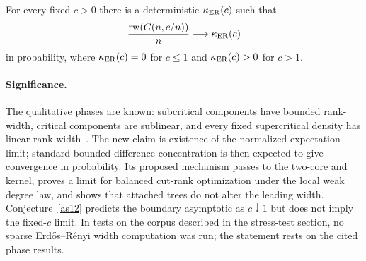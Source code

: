 \begin{conjecture}\label{as15}
For every fixed $c>0$ there is a deterministic $\kappa_{\rm ER}(c)$ such that
\[
 \frac{\operatorname{rw}(G(n,c/n))}{n}\longrightarrow
 \kappa_{\rm ER}(c)
\]
in probability, where $\kappa_{\rm ER}(c)=0$ for $c\le1$ and
$\kappa_{\rm ER}(c)>0$ for $c>1$.
\end{conjecture}

\paragraph{Significance.}
The qualitative phases are known: subcritical components have bounded
rank-width, critical components are sublinear, and every fixed supercritical
density has linear rank-width~\cite{LeeLeeOum12,DoErdeKang24}.  The new claim
is existence of the normalized expectation limit; standard bounded-difference
concentration is then expected to give convergence in probability.  Its proposed
mechanism passes to the two-core and kernel, proves a limit for balanced
cut-rank optimization under the local weak degree law, and shows that
attached trees do not alter the leading width.  Conjecture~\ref{as12}
predicts the boundary asymptotic as $c\downarrow1$ but does not imply the
fixed-$c$ limit.  In tests on the corpus described in the stress-test section, no sparse
Erd\H os--R\'enyi width computation was run; the statement rests on the
cited phase results.
